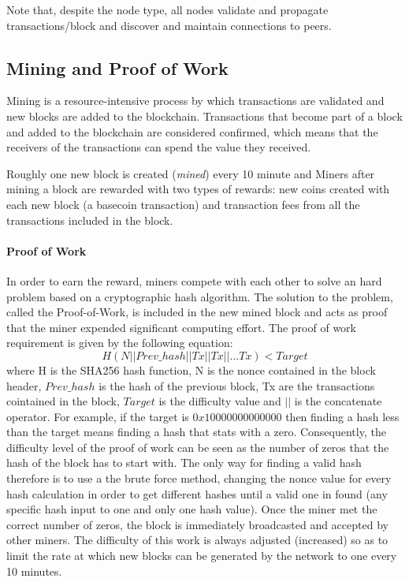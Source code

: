 Note that, despite the node type, all nodes validate and propagate
transactions/block and discover and maintain connections to peers.










\subsection{Mining and Proof of Work} Mining is a resource-intensive
process by which transactions are validated and new blocks are added to the
blockchain. Transactions that become part of a block and added to the blockchain
are considered confirmed, which means that the receivers of the transactions can
spend the value they received.

Roughly one new block is created (\emph{mined}) every 10 minute and Miners after
mining a block are rewarded with two types of rewards: new coins created with
each new block (a basecoin transaction) and transaction fees from all the
transactions included in the block.

\paragraph{Proof of Work} In order to earn the reward, miners compete with each
other to solve an hard problem based on a cryptographic hash algorithm. The
solution to the problem, called the Proof-of-Work, is included in the new mined
block and acts as proof that the miner expended significant computing effort.
The proof of work requirement is given by the following equation:
\begin{equation}\label{eq:proof-of-work}
  H ( N || Prev\_hash || Tx || Tx || . . . Tx) < Target
\end{equation} where H is the SHA256 hash function, N is the nonce
contained in the block header, $Prev\_hash$ is the hash of the previous block,
Tx are the transactions cointained in the block, $Target$ is the difficulty
value and $||$ is the concatenate operator.
For example, if the target is $0x10000000000000$ then finding a hash less than
the target means finding a hash that stats with a zero. Consequently, the
difficulty level of the proof of work can be seen as the number of zeros that the
hash of the block has to start with. The only way for finding a valid hash therefore
is to use a the brute force method, changing the nonce value for every hash
calculation in order to get different hashes until a valid one in found
(any specific hash input to one and only one hash value).
Once the miner met the correct number of zeros, the block is immediately
broadcasted and accepted by other miners.
The difficulty of this work is always adjusted (increased) so as to limit the
rate at which new blocks can be generated by the network to one every 10 minutes.

